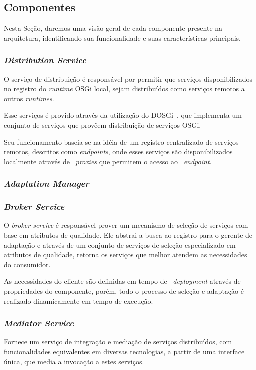 \subsection{Componentes}
Nesta Seção, daremos uma visão geral de cada componente presente na arquitetura, identificando sua funcionalidade e suas características principais.

\subsubsection{\textit{Distribution Service}}
O serviço de distribuição é responsável por permitir que serviços disponibilizados no registro do \textit{runtime} OSGi local, sejam distribuídos como serviços remotos a outros \textit{runtimes}.

Esse serviços é provido através da utilização do DOSGi~\cite{dosgi}, que implementa um conjunto de serviços que provêem distribuição de serviços OSGi. 

Seu funcionamento baseia-se na idéia de um registro centralizado de serviços remotos, descritos como \textit{endpoints}, onde esses serviços são disponibilizados localmente através de ~\textit{proxies} que permitem o acesso ao ~\textit{endpoint}.

\subsubsection{\textit{Adaptation Manager}}

\subsubsection{\textit{Broker Service}}
O \textit{broker service} é responsável prover um mecanismo de seleção de serviços com base em atributos de qualidade. Ele abstrai a busca ao registro para o gerente de adaptação e através de um conjunto de serviços de seleção especializado em atributos de qualidade, retorna os serviços que melhor atendem as necessidades do consumidor.

As necessidades do cliente são definidas em tempo de ~\textit{deployment} através de propriedades do componente, porém, todo o processo de seleção e adaptação é realizado dinamicamente em tempo de execução. 


\subsubsection{\textit{Mediator Service}}
Fornece um serviço de integração e mediação de serviços distribuídos, com funcionalidades equivalentes em diversas tecnologias, a partir de uma interface única, que media a invocação a estes serviços. 

